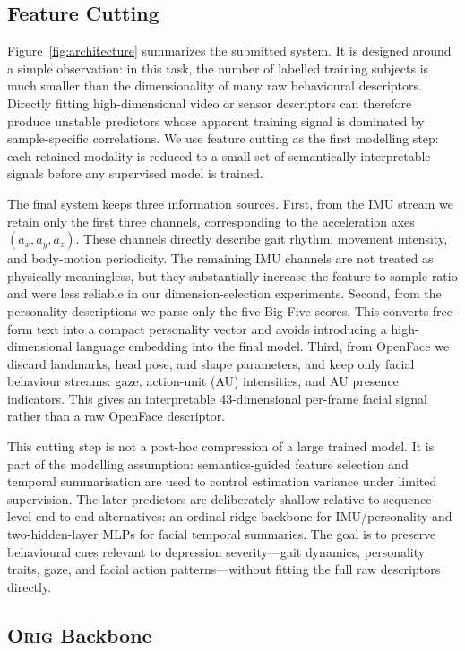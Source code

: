 \documentclass[sigconf,screen,review]{acmart}
\begin{document}
\subsection{Feature Cutting}
\label{sec:method-cutting}

Figure~\ref{fig:architecture} summarizes the submitted system. It is designed
around a simple observation: in this task, the number of labelled training
subjects is much smaller than the dimensionality of many raw behavioural
descriptors. Directly fitting high-dimensional video or sensor descriptors can
therefore produce unstable predictors whose apparent training signal is
dominated by sample-specific correlations. We use feature cutting as the first
modelling step: each retained modality is reduced to a small set of semantically
interpretable signals before any supervised model is trained.

The final system keeps three information sources. First, from the IMU stream we
retain only the first three channels, corresponding to the acceleration axes
$(a_x,a_y,a_z)$. These channels directly describe gait rhythm, movement
intensity, and body-motion periodicity. The remaining IMU channels are not
treated as physically meaningless, but they substantially increase the
feature-to-sample ratio and were less reliable in our dimension-selection
experiments. Second, from the personality descriptions we parse only the five
Big-Five scores. This converts free-form text into a compact personality vector
and avoids introducing a high-dimensional language embedding into the final
model. Third, from OpenFace we discard landmarks, head pose, and shape
parameters, and keep only facial behaviour streams: gaze, action-unit (AU)
intensities, and AU presence indicators. This gives an interpretable
43-dimensional per-frame facial signal rather than a raw OpenFace descriptor.

This cutting step is not a post-hoc compression of a large trained model. It is
part of the modelling assumption: semantics-guided feature selection and
temporal summarisation are used to control estimation variance under limited
supervision. The later predictors are deliberately shallow relative to
sequence-level end-to-end alternatives: an ordinal ridge backbone for
IMU/personality and two-hidden-layer MLPs for facial temporal summaries. The
goal is to preserve behavioural cues relevant to depression severity---gait
dynamics, personality traits, gaze, and facial action patterns---without fitting
the full raw descriptors directly.

\subsection{\textsc{Orig} Backbone}
\label{sec:method-orig}
\end{document}
